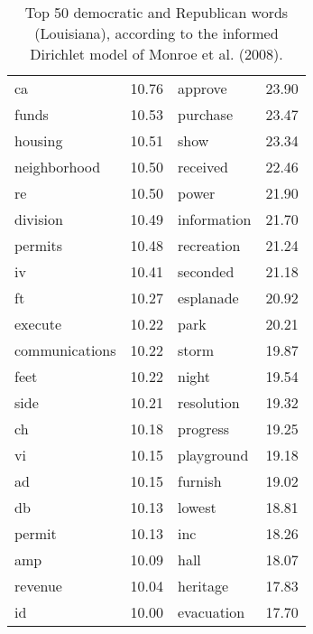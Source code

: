 \begin{table}[ht]
\begin{tabular}{lrlr}
  ca & 10.76 & approve & 23.90 \\ 
  funds & 10.53 & purchase & 23.47 \\ 
  housing & 10.51 & show & 23.34 \\ 
  neighborhood & 10.50 & received & 22.46 \\ 
  re & 10.50 & power & 21.90 \\ 
  division & 10.49 & information & 21.70 \\ 
  permits & 10.48 & recreation & 21.24 \\ 
  iv & 10.41 & seconded & 21.18 \\ 
  ft & 10.27 & esplanade & 20.92 \\ 
  execute & 10.22 & park & 20.21 \\ 
  communications & 10.22 & storm & 19.87 \\ 
  feet & 10.22 & night & 19.54 \\ 
  side & 10.21 & resolution & 19.32 \\ 
  ch & 10.18 & progress & 19.25 \\ 
  vi & 10.15 & playground & 19.18 \\ 
  ad & 10.15 & furnish & 19.02 \\ 
  db & 10.13 & lowest & 18.81 \\ 
  permit & 10.13 & inc & 18.26 \\ 
  amp & 10.09 & hall & 18.07 \\ 
  revenue & 10.04 & heritage & 17.83 \\ 
  id & 10.00 & evacuation & 17.70 \\ 
   \hline
\end{tabular}
\endgroup
\caption{Top 50 democratic and Republican words (Louisiana), according to the informed 
Dirichlet model of Monroe et al. (2008).} 
\label{tabFightinLA}
\end{table}

